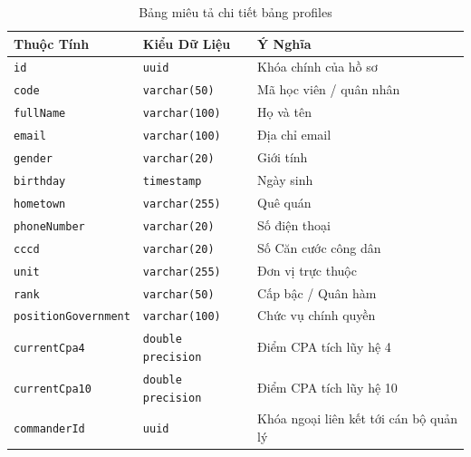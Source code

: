 \documentclass[../DoAn.tex]{subfiles}
\begin{document}
\begin{table}[H]
\centering
\small
\renewcommand{\arraystretch}{1.2}
\begin{tabular}{|l|p{4.5cm}|p{7.5cm}|}
\hline
\textbf{Thuộc Tính} & \textbf{Kiểu Dữ Liệu} & \textbf{Ý Nghĩa} \\ \hline
\texttt{id} & \texttt{uuid} & Khóa chính của hồ sơ \\ \hline
\texttt{code} & \texttt{varchar(50)} & Mã học viên / quân nhân \\ \hline
\texttt{fullName} & \texttt{varchar(100)} & Họ và tên \\ \hline
\texttt{email} & \texttt{varchar(100)} & Địa chỉ email \\ \hline
\texttt{gender} & \texttt{varchar(20)} & Giới tính \\ \hline
\texttt{birthday} & \texttt{timestamp} & Ngày sinh \\ \hline
\texttt{hometown} & \texttt{varchar(255)} & Quê quán \\ \hline
\texttt{phoneNumber} & \texttt{varchar(20)} & Số điện thoại \\ \hline
\texttt{cccd} & \texttt{varchar(20)} & Số Căn cước công dân \\ \hline
\texttt{unit} & \texttt{varchar(255)} & Đơn vị trực thuộc \\ \hline
\texttt{rank} & \texttt{varchar(50)} & Cấp bậc / Quân hàm \\ \hline
\texttt{positionGovernment} & \texttt{varchar(100)} & Chức vụ chính quyền \\ \hline
\texttt{currentCpa4} & \texttt{double precision} & Điểm CPA tích lũy hệ 4 \\ \hline
\texttt{currentCpa10} & \texttt{double precision} & Điểm CPA tích lũy hệ 10 \\ \hline
\texttt{commanderId} & \texttt{uuid} & Khóa ngoại liên kết tới cán bộ quản lý \\ \hline
\end{tabular}
\caption{Bảng miêu tả chi tiết bảng profiles}
\label{tab:profile_details}
\end{table}
\end{document}
